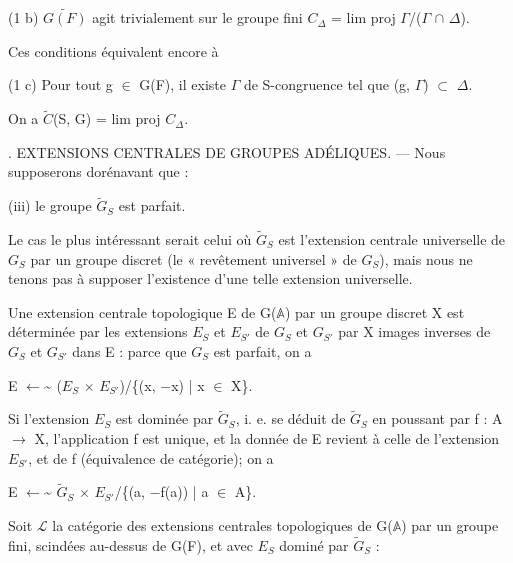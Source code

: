 \documentclass[10pt,a4paper]{article}
\begin{document}
\smallskip
\noindent (1 b) \ensuremath{\widetilde{G(F)}} agit trivialement sur le groupe fini \ensuremath{C_Δ} = lim proj \ensuremath{Γ}/(\ensuremath{Γ} \ensuremath{∩} \ensuremath{Δ}).\par
\smallskip
\noindent Ces conditions équivalent encore à\par
\smallskip
\noindent (1 c) Pour tout g \ensuremath{∈} G(F), il existe \ensuremath{Γ} de S-congruence tel que (g, \ensuremath{Γ}) \ensuremath{⊂} \ensuremath{Δ}.\par
\smallskip
\noindent On a \ensuremath{\widetilde{C}}(S, G) = lim proj \ensuremath{C_Δ}.\par
\smallskip
{}. EXTENSIONS CENTRALES DE GROUPES ADÉLIQUES. — Nous supposerons dorénavant que :\par
\smallskip
\noindent (iii) le groupe \ensuremath{\widetilde{G}_S} est parfait.\par
\smallskip
\noindent Le cas le plus intéressant serait celui où \ensuremath{\widetilde{G}_S} est l'extension centrale universelle de \ensuremath{G_S} par un groupe discret (le « revêtement universel » de \ensuremath{G_S}), mais nous ne tenons pas à supposer l'existence d'une telle extension universelle.\par
\smallskip
\noindent Une extension centrale topologique E de G(\ensuremath{𝔸}) par un groupe discret X est déterminée par les extensions \ensuremath{E_S} et \ensuremath{E_{S′}} de \ensuremath{G_S} et \ensuremath{G_{S′}} par X images inverses de \ensuremath{G_S} et \ensuremath{G_{S′}} dans E : parce que \ensuremath{G_S} est parfait, on a\par
\smallskip
\noindent E  \ensuremath{←}\textasciitilde{}  (\ensuremath{E_S} \ensuremath{×} \ensuremath{E_{S′}})/\{(x, \ensuremath{−}x) | x \ensuremath{∈} X\}.\par
\smallskip
\noindent Si l'extension \ensuremath{E_S} est dominée par \ensuremath{\widetilde{G}_S}, i. e. se déduit de \ensuremath{\widetilde{G}_S} en poussant par f : A \ensuremath{→} X, l'application f est unique, et la donnée de E revient à celle de l'extension \ensuremath{E_{S′}}, et de f (équivalence de catégorie); on a\par
\smallskip
\noindent E  \ensuremath{←}\textasciitilde{}  \ensuremath{\widetilde{G}_S} \ensuremath{×} \ensuremath{E_{S′}}/\{(a, \ensuremath{−}f(a)) | a \ensuremath{∈} A\}.\par
\smallskip
\noindent Soit \ensuremath{ℒ} la catégorie des extensions centrales topologiques de G(\ensuremath{𝔸}) par un groupe fini, scindées au-dessus de G(F), et avec \ensuremath{E_S} dominé par \ensuremath{\widetilde{G}_S} :\par
\end{document}
